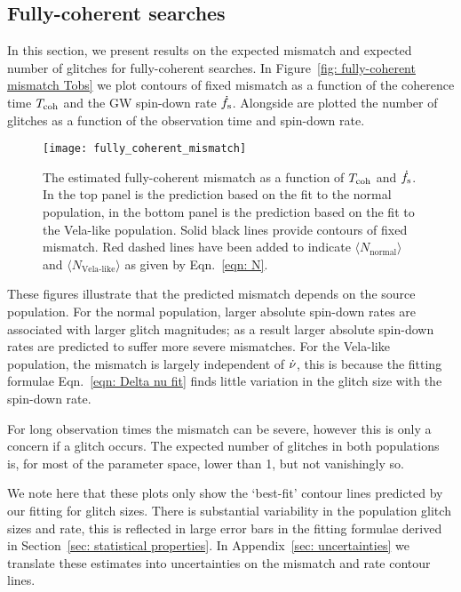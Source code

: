 \documentclass[../full_thesis/full_thesis.tex]{subfiles}
\begin{document}
\subsection{Fully-coherent searches}

In this section, we present results on the expected mismatch and expected number
of glitches for fully-coherent searches. In Figure~\ref{fig: fully-coherent mismatch
Tobs} we plot contours of fixed mismatch as a function of the coherence time
$T_{\mathrm{coh}}$ and the GW spin-down rate $\dot{f}_{\textrm{s}}$. Alongside are plotted the number of
glitches as a function of the observation time and spin-down rate.
\begin{figure}[htb] \centering
\texttt{[image: fully\_coherent\_mismatch]}
\caption{The estimated fully-coherent
mismatch as a function of $T_{\mathrm{coh}}$ and $\dot{f}_{\textrm{s}}$. In the top panel is the
prediction based on the fit
to the normal population, in the bottom panel is the prediction based on
the fit to the Vela-like population. Solid black lines provide contours of fixed
mismatch. Red dashed lines have been added to indicate $\langle
N_\textrm{normal} \rangle$ and $\langle N_\textrm{Vela-like} \rangle$ as given
by Eqn.~\eqref{eqn: N}.}
\label{fig: fully-coherent mismatch Tobs}
\end{figure}

These figures illustrate that the predicted mismatch depends on the source
population. For the normal population, larger absolute spin-down rates are
associated with larger glitch magnitudes; as a result larger absolute spin-down
rates are predicted to suffer more severe mismatches. For the Vela-like
population, the mismatch is largely independent of $\dot{\nu}$, this is because
the fitting formulae Eqn.~\eqref{eqn: Delta nu fit} finds little variation in
the glitch size with the spin-down rate.

For long observation times the mismatch can be severe, however this is only a
concern if a glitch occurs. The expected number of glitches in both populations
is, for most of the parameter space, lower than 1, but not vanishingly so.

We note here that these plots only show the `best-fit' contour lines predicted
by our fitting for glitch sizes. There is substantial variability in the population
glitch sizes and rate, this is reflected in large error bars in the fitting formulae
derived in Section~\ref{sec: statistical properties}. In Appendix~\ref{sec: uncertainties}
we translate these estimates into uncertainties on the mismatch and rate
contour lines.
\end{document}
